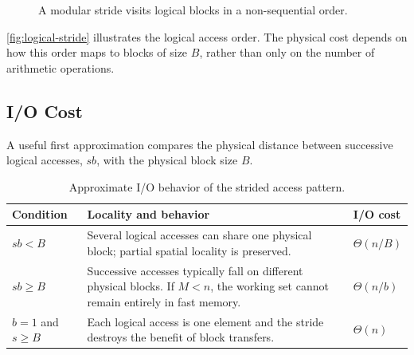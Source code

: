 \begin{figure}[H]
  \centering
  \caption{A modular stride visits logical blocks in a non-sequential order.}
  \label{fig:logical-stride}
\end{figure}

\autoref{fig:logical-stride} illustrates the logical access order. The
physical cost depends on how this order maps to blocks of size $B$, rather
than only on the number of arithmetic operations.

\subsection{I/O Cost}
\label{subsec:stride-io}

A useful first approximation compares the physical distance between successive
logical accesses, $s b$, with the physical block size $B$.

\begin{table}[H]
  \centering
  \caption{Approximate I/O behavior of the strided access pattern.}
  \label{tab:stride-io}
  \begin{tabularx}{\textwidth}{@{}p{}YY@{}}
    \toprule
    Condition & Locality and behavior & I/O cost \\
    \midrule
    $s b < B$ & Several logical accesses can share one physical block; partial
      spatial locality is preserved. & $\Theta(n/B)$ \\
    $s b \geq B$ & Successive accesses typically fall on different physical
      blocks. If $M<n$, the working set cannot remain entirely in fast memory. &
      $\Theta(n/b)$ \\
    $b=1$ and $s\geq B$ & Each logical access is one element and the stride
      destroys the benefit of block transfers. & $\Theta(n)$ \\
    \bottomrule
  \end{tabularx}
\end{table}

